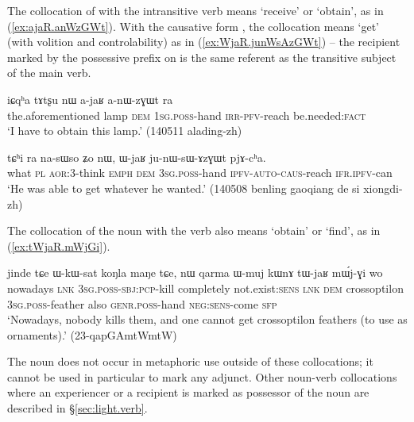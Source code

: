 The collocation of  with the intransitive verb  means `receive' or `obtain', as in (\ref{ex:ajaR.anWzGWt}). With the causative form , the collocation means `get' (with volition and controlability) as in (\ref{ex:WjaR.junWsAzGWt}) -- the recipient marked by the possessive prefix on   is the same referent as the transitive subject of the main verb.

\begin{exe}
\ex \label{ex:ajaR.anWzGWt}
\gll iɕqʰa tɤtʂu nɯ a-jaʁ a-nɯ-zɣɯt ra \\
the.aforementioned lamp \textsc{dem} \textsc{1sg}.\textsc{poss}-hand \textsc{irr}-\textsc{pfv}-reach be.needed:\textsc{fact} \\
\glt   `I have to obtain this lamp.' (140511 alading-zh)
\end{exe}

\begin{exe}
\ex \label{ex:WjaR.junWsAzGWt}
\gll tɕʰi ra na-sɯso ʑo nɯ, ɯ-jaʁ ju-nɯ-sɯ-ɤzɣɯt pjɤ-cʰa.  \\
what \textsc{pl} \textsc{aor}:3\flobv{}-think \textsc{emph} \textsc{dem} \textsc{3sg}.\textsc{poss}-hand \textsc{ipfv}-\textsc{auto}-\textsc{caus}-reach \textsc{ifr}.\textsc{ipfv}-can \\
\glt  `He was able to get whatever he wanted.' (140508 benling gaoqiang de si xiongdi-zh) 
\end{exe}

The collocation of the noun  with the verb  also means `obtain' or `find', as in (\ref{ex:tWjaR.mWjGi}).

\begin{exe}
\ex \label{ex:tWjaR.mWjGi}
\gll jinde tɕe ɯ-kɯ-sat koŋla maŋe tɕe, nɯ qarma ɯ-muj kɯnɤ tɯ-jaʁ mɯ́j-ɣi wo\\
nowadays \textsc{lnk} \textsc{3sg}.\textsc{poss}-\textsc{sbj}:\textsc{pcp}-kill completely not.exist:\textsc{sens} \textsc{lnk} \textsc{dem} crossoptilon \textsc{3sg}.\textsc{poss}-feather also \textsc{genr}.\textsc{poss}-hand \textsc{neg}:\textsc{sens}-come \textsc{sfp}\\
\glt `Nowadays, nobody kills them, and one cannot get crossoptilon feathers (to use as ornaments).' (23-qapGAmtWmtW)
\end{exe}

The noun  does not occur in metaphoric use outside of these collocations; it cannot be used in particular to mark any adjunct. Other noun-verb collocations where an experiencer or a recipient is marked as possessor of the noun are described in §\ref{sec:light.verb}.


